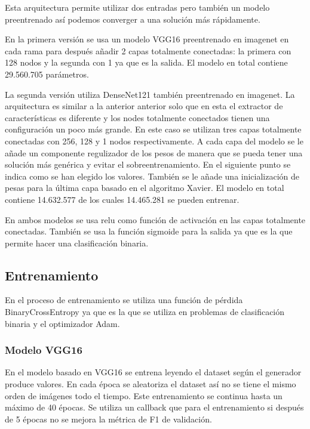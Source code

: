 \documentclass[12pt]{article}
\begin{document}
    Esta arquitectura permite utilizar dos entradas pero también un modelo preentrenado así podemos converger a una
    solución más rápidamente.

    En la primera versión se usa un modelo VGG16 preentrenado en imagenet en cada rama para después añadir 2 capas
    totalmente conectadas: la primera con 128 nodos y la segunda con 1 ya que es la salida.
    El modelo en total contiene 29.560.705 parámetros.

    La segunda versión utiliza DenseNet121 también preentrenado en imagenet.
    La arquitectura es similar a la anterior anterior solo que en esta el extractor de características es diferente y
    los nodes totalmente conectados tienen una configuración un poco más grande.
    En este caso se utilizan tres capas totalmente conectadas con 256, 128 y 1 nodos respectivamente.
    A cada capa del modelo se le añade un componente regulizador de los pesos de manera que se pueda tener una solución
    más genérica y evitar el sobreentrenamiento.
    En el siguiente punto se indica como se han elegido los valores.
    También se le añade una inicialización de pesas para la última capa basado en el algoritmo Xavier\cite{Xavier_init}.
    El modelo en total contiene 14.632.577 de los cuales 14.465.281 se pueden entrenar.

    En ambos modelos se usa relu como función de activación en las capas totalmente conectadas.
    También se usa la función sigmoide para la salida ya que es la que permite hacer una clasificación
    binaria.

    \subsection{Entrenamiento}
    En el proceso de entrenamiento se utiliza una función de pérdida BinaryCrossEntropy ya que es la que se utiliza
    en problemas de clasificación binaria y el optimizador Adam.

    \subsubsection{Modelo VGG16}
    En el modelo basado en VGG16 se entrena leyendo el dataset según el generador produce valores.
    En cada época se aleatoriza el dataset así no se tiene el mismo orden de imágenes todo el tiempo.
    Este entrenamiento se continua hasta un máximo de 40 épocas.
    Se utiliza un callback que para el entrenamiento si después de 5 épocas no se mejora la métrica de F1 de
    validación.
\end{document}
